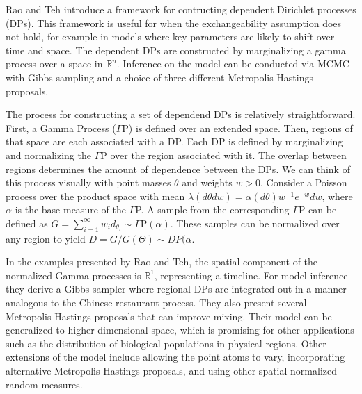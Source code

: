 \documentclass[12pt,letterpaper]{article}
\begin{document}
Rao and Teh introduce a framework for contructing dependent Dirichlet processes (DPs). This framework is useful for when the exchangeability assumption does not hold, for example in models where key parameters are likely to shift over time and space. The dependent DPs are constructed by marginalizing a gamma process over a space in $\mathbb{R}^n$. Inference on the model can be conducted via MCMC with Gibbs sampling and a choice of three different Metropolis-Hastings proposals.

The process for constructing a set of dependend DPs is relatively straightforward. First, a Gamma Process ($\Gamma$P) is defined over an extended space. Then, regions of that space are each associated with a DP. Each DP is defined by marginalizing and normalizing the $\Gamma$P over the region associated with it. The overlap between regions determines the amount of dependence between the DPs. We can think of this process visually with point masses $\theta$ and weights $w>0$. Consider a Poisson process over the product space with mean $\lambda(d\theta dw) = \alpha(d \theta)w^{-1}e^{-w}dw$, where $\alpha$ is the base measure of the $\Gamma$P. A sample from the corresponding $\Gamma$P can be defined as $G= \sum_{i=1}^{\infty} w_i d_{\theta_i} \sim \Gamma \text{P} (\alpha)$. These samples can be normalized over any region to yield $D=G/G(\Theta) \sim DP(\alpha$. 

In the examples presented by Rao and Teh, the spatial component of the normalized Gamma processes is $\mathbb{R}^1$, representing a timeline. For model inference they derive a Gibbs sampler where regional DPs are integrated out in a manner analogous to the Chinese restaurant process. They also present several Metropolis-Hastings proposals that can improve mixing. Their model can be generalized to higher dimensional space, which is promising for other applications such as the distribution of biological populations in physical regions. Other extensions of the model include allowing the point atoms to vary, incorporating alternative Metropolis-Hastings proposals, and using other spatial normalized random measures. 
\end{document}
